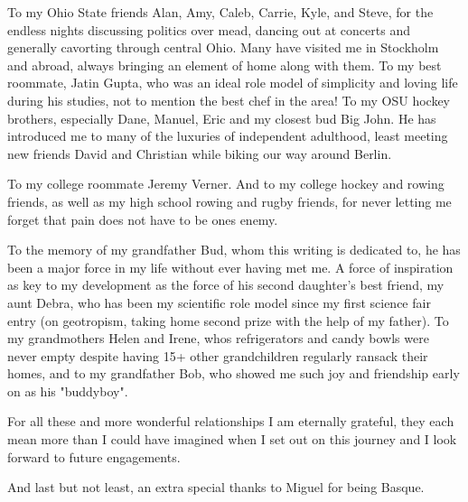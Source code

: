 To my Ohio State friends Alan, Amy, Caleb, Carrie, Kyle, and Steve, for the endless nights discussing politics over mead, dancing out at concerts and generally cavorting through central Ohio. Many have visited me in Stockholm and abroad, always bringing an element of home along with them. To my best roommate, Jatin Gupta, who was an ideal role model of simplicity and loving life during his studies, not to mention the best chef in the area! To my OSU hockey brothers, especially Dane, Manuel, Eric and my closest bud Big John. He has introduced me to many of the luxuries of independent adulthood, least meeting new friends David and Christian while biking our way around Berlin.

To my college roommate Jeremy Verner. And to my college hockey and rowing friends, as well as my high school rowing and rugby friends, for never letting me forget that pain does not have to be ones enemy.

To the memory of my grandfather Bud, whom this writing is dedicated to, he has been a major force in my life without ever having met me. A force of inspiration as key to my development as the force of his second daughter's best friend, my aunt Debra, who has been my scientific role model since my first science fair entry (on geotropism, taking home second prize with the help of my father). To my grandmothers Helen and Irene, whos refrigerators and candy bowls were never empty despite having 15+ other grandchildren regularly ransack their homes, and to my grandfather Bob, who showed me such joy and friendship early on as his "buddyboy".

For all these and more wonderful relationships I am eternally grateful, they each mean more than I could have imagined when I set out on this journey and I look forward to future engagements.




And last but not least, an extra special thanks to Miguel for being Basque.



